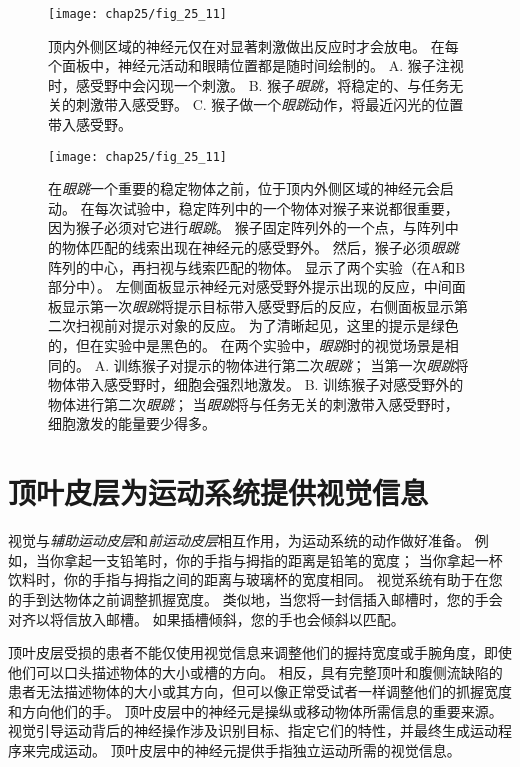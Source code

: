 \begin{figure}[htbp]
	\centering
	\texttt{[image: chap25/fig\_25\_11]}
	\caption{顶内外侧区域的神经元仅在对显著刺激做出反应时才会放电。
		在每个面板中，神经元活动和眼睛位置都是随时间绘制的。
		A. 猴子注视时，感受野中会闪现一个刺激。
		B. 猴子\textit{眼跳}，将稳定的、与任务无关的刺激带入感受野。
		C. 猴子做一个\textit{眼跳}动作，将最近闪光的位置带入感受野。}
	\label{fig:25_11}
\end{figure}


\begin{figure}[htbp]
	\centering
	\texttt{[image: chap25/fig\_25\_11]}
	\caption{在\textit{眼跳}一个重要的稳定物体之前，位于顶内外侧区域的神经元会启动。
		在每次试验中，稳定阵列中的一个物体对猴子来说都很重要，因为猴子必须对它进行\textit{眼跳}。
		猴子固定阵列外的一个点，与阵列中的物体匹配的线索出现在神经元的感受野外。
		然后，猴子必须\textit{眼跳}阵列的中心，再扫视与线索匹配的物体。
		显示了两个实验（在A和B部分中）。
		左侧面板显示神经元对感受野外提示出现的反应，中间面板显示第一次\textit{眼跳}将提示目标带入感受野后的反应，右侧面板显示第二次扫视前对提示对象的反应。
		为了清晰起见，这里的提示是绿色的，但在实验中是黑色的。
		在两个实验中，\textit{眼跳}时的视觉场景是相同的。
		A. 训练猴子对提示的物体进行第二次\textit{眼跳}；
		当第一次\textit{眼跳}将物体带入感受野时，细胞会强烈地激发。
		B. 训练猴子对感受野外的物体进行第二次\textit{眼跳}；
		当\textit{眼跳}将与任务无关的刺激带入感受野时，细胞激发的能量要少得多。}
	\label{fig:25_12}
\end{figure}



\section{顶叶皮层为运动系统提供视觉信息}

视觉与\textit{辅助运动皮层}和\textit{前运动皮层}相互作用，为运动系统的动作做好准备。
例如，当你拿起一支铅笔时，你的手指与拇指的距离是铅笔的宽度；
当你拿起一杯饮料时，你的手指与拇指之间的距离与玻璃杯的宽度相同。
视觉系统有助于在您的手到达物体之前调整抓握宽度。
类似地，当您将一封信插入邮槽时，您的手会对齐以将信放入邮槽。
如果插槽倾斜，您的手也会倾斜以匹配。


顶叶皮层受损的患者不能仅使用视觉信息来调整他们的握持宽度或手腕角度，即使他们可以口头描述物体的大小或槽的方向。
相反，具有完整顶叶和腹侧流缺陷的患者无法描述物体的大小或其方向，但可以像正常受试者一样调整他们的抓握宽度和方向他们的手。
顶叶皮层中的神经元是操纵或移动物体所需信息的重要来源。
视觉引导运动背后的神经操作涉及识别目标、指定它们的特性，并最终生成运动程序来完成运动。
顶叶皮层中的神经元提供手指独立运动所需的视觉信息。


